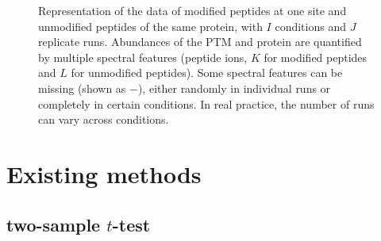 \documentclass{mcp}
\begin{document}
\begin{figure}[h!]
\begin{footnotesize}
\end{footnotesize}
\caption{Representation of the data of modified peptides at one site and unmodified peptides of the same protein, with $I$ conditions and $J$ replicate runs. Abundances of the PTM and protein are quantified by multiple spectral features (peptide ions, $K$ for modified peptides and $L$ for unmodified peptides). Some spectral features can be missing (shown as $-$), either randomly in individual runs or completely in certain conditions. In real practice, the number of runs can vary across conditions. \label{fig:dtable}}
\end{figure}


\section{Existing methods} \label{sec:ttest}
\subsection{two-sample $t$-test}
\end{document}
